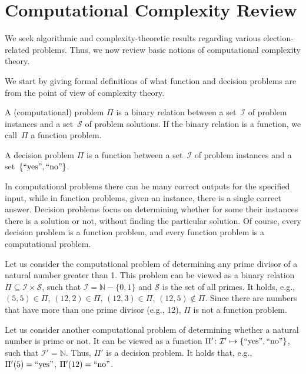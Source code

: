 \section{Computational Complexity Review} \label{sec:complexity}

We seek algorithmic and complexity-theoretic results regarding various election-related problems.
Thus, we now review basic notions of computational complexity theory.

We start by giving formal definitions of what function and decision problems are from the point of view of complexity theory.

\begin{definition}
    A (computational) problem $\Pi$ is a binary relation between a set \,$\mathcal{I}$ of problem instances and a set \,$\mathcal{S}$ of problem solutions.
	If the binary relation is a function, we call \,$\Pi$ a function problem.
\end{definition}

\begin{definition}
    A decision problem $\Pi$ is a function between a set \,$\mathcal{I}$ of problem instances and a set \,$\{\textnormal{``yes''},\textnormal{``no''}\}$.
\end{definition}

In computational problems there can be many correct outputs for the specified input, while in function problems, given an instance, there is a single correct answer.
Decision problems focus on determining whether for some their instances there is a solution or not, without finding the particular solution.
Of course, every decision problem is a function problem, and every function problem is a computational problem.

\begin{Example} \label{ex:problems}
    Let us consider the computational problem of determining any prime divisor of a natural number greater than 1.
	This problem can be viewed as a binary relation $\Pi\subseteq\mathcal{I}\times\mathcal{S}$, such that $\mathcal{I}=\mathbb{N}-\{0,1\}$ and $\mathcal{S}$ is the set of all primes.
	It holds, e.g., $(5,5)\in\Pi$, $(12,2)\in\Pi$, $(12,3)\in\Pi$, $(12,5)\not\in\Pi$.
	Since there are numbers that have more than one prime divisor (e.g., 12), $\Pi$ is not a function problem.

	Let us consider another computational problem of determining whether a natural number is prime or not.
	It can be viewed as a function $\Pi'\colon\mathcal{I}'\mapsto\{\textnormal{``yes''},\textnormal{``no''}\}$, such that $\mathcal{I}'=\mathbb{N}$.
	Thus, $\Pi'$ is a decision problem.
	It holds that, e.g., $\Pi'(5)=\textnormal{``yes''}$, $\Pi'(12)=\textnormal{``no''}$.
\end{Example}

